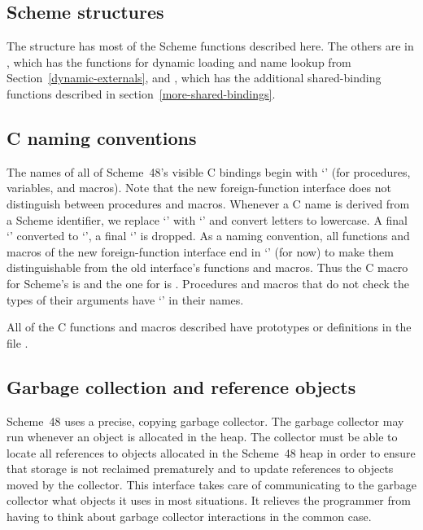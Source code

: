 \subsection{Scheme structures}

The structure  has 
 most of the Scheme functions described here.
The others are in 
 , which has the functions for dynamic loading and
 name lookup from
Section~\ref{dynamic-externals},
 and , which has the additional shared-binding functions
 described in
section~\ref{more-shared-bindings}.


\subsection{C naming conventions}

The names of all of Scheme~48's visible C bindings begin with
`' (for procedures, variables, and macros).  Note that the
new foreign-function interface does not distinguish between procedures
and macros.  Whenever a C name is derived from a Scheme identifier, we
replace `\code{-}' with `\code{\_}' and convert letters to lowercase.
A final `'  converted to `', a final `\code{!}' is
dropped.  As a naming convention, all functions and macros of the new
foreign-function interface end in `' (for now) to make them
distinguishable from the old interface's functions and macros.  Thus
the C macro for Scheme's  is  and
the one for   is .  Procedures
and macros that do not check the types of their arguments have
`' in their names.

All of the C functions and macros described have prototypes or
definitions in the file .


\subsection{Garbage collection and reference objects}
\label{sec:reference-objects}

Scheme~48 uses a precise, copying garbage collector.  The garbage
collector may run whenever an object is allocated in the heap.  The
collector must be able to locate all references to objects allocated
in the Scheme~48 heap in order to ensure that storage is not reclaimed
prematurely and to update references to objects moved by the
collector.  This interface takes care of communicating to the garbage
collector what objects it uses in most situations.  It relieves the
programmer from having to think about garbage collector interactions
in the common case.

